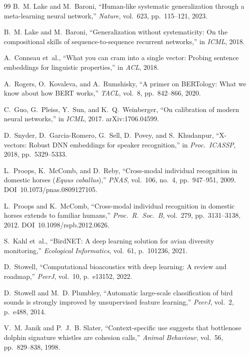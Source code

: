 \begin{thebibliography}{99}
B.~M. Lake and M.~Baroni, ``Human-like systematic generalization through a
meta-learning neural network,'' \emph{Nature}, vol.~623, pp.~115--121, 2023.

B.~M. Lake and M.~Baroni, ``Generalization without systematicity: On the
compositional skills of sequence-to-sequence recurrent networks,'' in
\emph{ICML}, 2018.

A.~Conneau et~al., ``What you can cram into a single vector: Probing sentence
embeddings for linguistic properties,'' in \emph{ACL}, 2018.

A.~Rogers, O.~Kovaleva, and A.~Rumshisky, ``A primer on BERTology: What we know
about how BERT works,'' \emph{TACL}, vol.~8, pp.~842--866, 2020.

C.~Guo, G.~Pleiss, Y.~Sun, and K.~Q.~Weinberger, ``On calibration of modern
neural networks,'' in \emph{ICML}, 2017. arXiv:1706.04599.

D.~Snyder, D.~Garcia-Romero, G.~Sell, D.~Povey, and S.~Khudanpur, ``X-vectors:
Robust DNN embeddings for speaker recognition,'' in \emph{Proc.\ ICASSP}, 2018,
pp.~5329--5333.

L.~Proops, K.~McComb, and D.~Reby, ``Cross-modal individual recognition in
domestic horses (\emph{Equus caballus}),'' \emph{PNAS}, vol.~106, no.~4,
pp.~947--951, 2009. DOI~10.1073/pnas.0809127105.

L.~Proops and K.~McComb, ``Cross-modal individual recognition in domestic
horses extends to familiar humans,'' \emph{Proc.\ R.\ Soc.\ B}, vol.~279,
pp.~3131--3138, 2012. DOI~10.1098/rspb.2012.0626.

S.~Kahl et~al., ``BirdNET: A deep learning solution for avian diversity
monitoring,'' \emph{Ecological Informatics}, vol.~61, p.~101236, 2021.

D.~Stowell, ``Computational bioacoustics with deep learning: A review and
roadmap,'' \emph{PeerJ}, vol.~10, p.~e13152, 2022.

D.~Stowell and M.~D. Plumbley, ``Automatic large-scale classification of bird
sounds is strongly improved by unsupervised feature learning,''
\emph{PeerJ}, vol.~2, p.~e488, 2014.

V.~M. Janik and P.~J.~B. Slater, ``Context-specific use suggests that bottlenose
dolphin signature whistles are cohesion calls,'' \emph{Animal Behaviour},
vol.~56, pp.~829--838, 1998.


\end{thebibliography}
